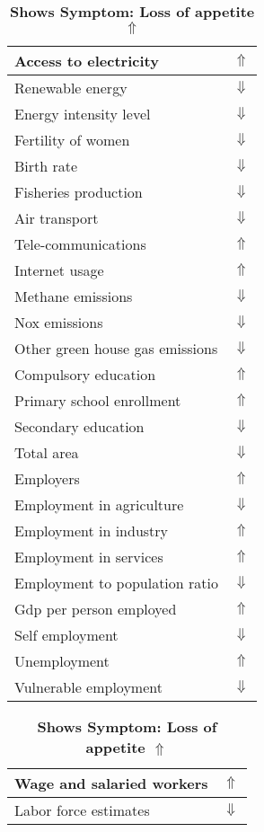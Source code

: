 \documentclass[12pt,notitlepage,oneside]{report}
\begin{document}
\begin{table}[!htb]
\caption{\textbf{Shows Symptom: Loss of appetite $\Uparrow$}}
\centering
\label{Correlated Socio-economic Factors0}
\begin{tabular}{|l|l|}
\hline
Access to electricity & $\Uparrow$\\ \hline
Renewable energy & $\Downarrow$\\ \hline
Energy intensity level & $\Downarrow$\\ \hline
Fertility of women & $\Downarrow$\\ \hline
Birth rate & $\Downarrow$\\ \hline
Fisheries production & $\Downarrow$\\ \hline
Air transport  & $\Downarrow$\\ \hline
Tele-communications & $\Uparrow$\\ \hline
Internet usage & $\Uparrow$\\ \hline
Methane emissions & $\Downarrow$\\ \hline
Nox emissions & $\Downarrow$\\ \hline
Other green house gas emissions & $\Downarrow$\\ \hline
Compulsory education & $\Uparrow$\\ \hline
Primary school enrollment & $\Uparrow$\\ \hline
Secondary education & $\Downarrow$\\ \hline
Total area & $\Downarrow$\\ \hline
Employers & $\Uparrow$\\ \hline
Employment in agriculture & $\Downarrow$\\ \hline
Employment in industry & $\Uparrow$\\ \hline
Employment in services & $\Uparrow$\\ \hline
Employment to population ratio & $\Downarrow$\\ \hline
Gdp per person employed & $\Uparrow$\\ \hline
Self employment & $\Downarrow$\\ \hline
Unemployment & $\Uparrow$\\ \hline
Vulnerable employment & $\Downarrow$\\ \hline
\end{tabular}
\begin{tabular}{|l|l|}
\hline
Wage and salaried workers & $\Uparrow$\\ \hline
Labor force estimates & $\Downarrow$\\ \hline

\end{tabular}
\end{table}
\end{document}

